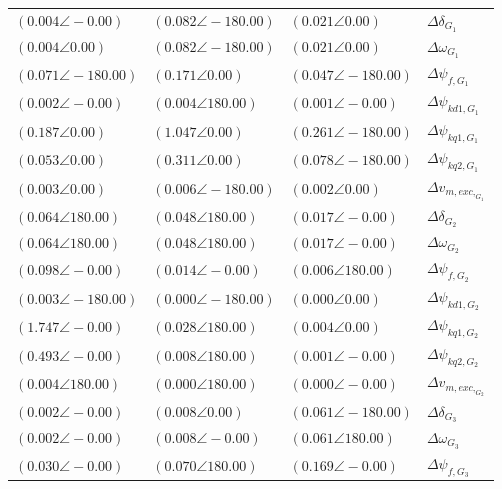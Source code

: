 \begin{tabular}{lll|l}
$(0.004 \angle -0.00)$	& $\mathbf{(0.082 \angle -180.00)}$	& $(0.021 \angle 0.00)$	& $\Delta\delta_{G_1}$ \\ 
$(0.004 \angle 0.00)$	& $\mathbf{(0.082 \angle -180.00)}$	& $(0.021 \angle 0.00)$	& $\Delta\omega_{G_1}$ \\ 
$\mathbf{(0.071 \angle -180.00)}$	& $\mathbf{(0.171 \angle 0.00)}$	& $(0.047 \angle -180.00)$	& $\Delta \psi_{f,G_1}$ \\ 
$(0.002 \angle -0.00)$	& $(0.004 \angle 180.00)$	& $(0.001 \angle -0.00)$	& $\Delta \psi_{kd1,G_1}$ \\ 
$\mathbf{(0.187 \angle 0.00)}$	& $\mathbf{(1.047 \angle 0.00)}$	& $\mathbf{(0.261 \angle -180.00)}$	& $\Delta \psi_{kq1,G_1}$ \\ 
$\mathbf{(0.053 \angle 0.00)}$	& $\mathbf{(0.311 \angle 0.00)}$	& $\mathbf{(0.078 \angle -180.00)}$	& $\Delta \psi_{kq2,G_1}$ \\ 
$(0.003 \angle 0.00)$	& $(0.006 \angle -180.00)$	& $(0.002 \angle 0.00)$	& $\Delta v_{m,exc,_{G_1}}$ \\ 
 \hline 
$\mathbf{(0.064 \angle 180.00)}$	& $(0.048 \angle 180.00)$	& $(0.017 \angle -0.00)$	& $\Delta\delta_{G_2}$ \\ 
$\mathbf{(0.064 \angle 180.00)}$	& $(0.048 \angle 180.00)$	& $(0.017 \angle -0.00)$	& $\Delta\omega_{G_2}$ \\ 
$\mathbf{(0.098 \angle -0.00)}$	& $(0.014 \angle -0.00)$	& $(0.006 \angle 180.00)$	& $\Delta \psi_{f,G_2}$ \\ 
$(0.003 \angle -180.00)$	& $(0.000 \angle -180.00)$	& $(0.000 \angle 0.00)$	& $\Delta \psi_{kd1,G_2}$ \\ 
$\mathbf{(1.747 \angle -0.00)}$	& $(0.028 \angle 180.00)$	& $(0.004 \angle 0.00)$	& $\Delta \psi_{kq1,G_2}$ \\ 
$\mathbf{(0.493 \angle -0.00)}$	& $(0.008 \angle 180.00)$	& $(0.001 \angle -0.00)$	& $\Delta \psi_{kq2,G_2}$ \\ 
$(0.004 \angle 180.00)$	& $(0.000 \angle 180.00)$	& $(0.000 \angle -0.00)$	& $\Delta v_{m,exc,_{G_2}}$ \\ 
 \hline 
$(0.002 \angle -0.00)$	& $(0.008 \angle 0.00)$	& $\mathbf{(0.061 \angle -180.00)}$	& $\Delta\delta_{G_3}$ \\ 
$(0.002 \angle -0.00)$	& $(0.008 \angle -0.00)$	& $\mathbf{(0.061 \angle 180.00)}$	& $\Delta\omega_{G_3}$ \\ 
$(0.030 \angle -0.00)$	& $\mathbf{(0.070 \angle 180.00)}$	& $\mathbf{(0.169 \angle -0.00)}$	& $\Delta \psi_{f,G_3}$ \\ 

\end{tabular}
